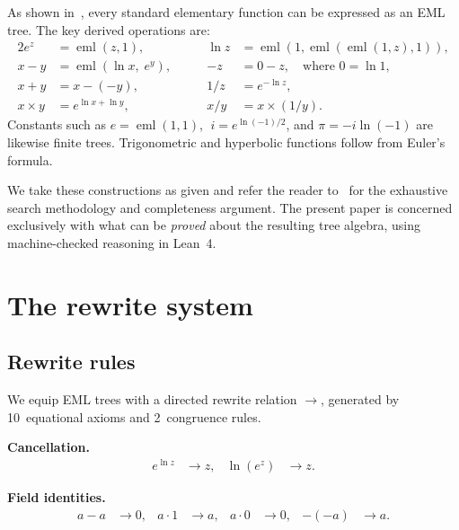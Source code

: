 \documentclass[11pt]{article}
\begin{document}
As shown in~\cite{odrzywolek2026}, every standard elementary function
can be expressed as an EML tree.  The key derived operations are:
\begin{alignat}{2}
  e^z        &= \operatorname{eml}(z, 1), &\qquad
  \ln z      &= \operatorname{eml}(1, \operatorname{eml}(\operatorname{eml}(1,z),1)),
  \label{eq:exp-ln} \\
  x - y      &= \operatorname{eml}(\ln x,\; e^y), &\qquad
  {-z}       &= 0 - z, \quad\text{where } 0 = \ln 1,
  \label{eq:sub-neg} \\
  x + y      &= x - (-y), &\qquad
  1/z        &= e^{-\ln z},
  \label{eq:add-inv} \\
  x \times y &= e^{\ln x + \ln y}, &\qquad
  x / y      &= x \times (1/y).
  \label{eq:mul-div}
\end{alignat}
Constants such as $e = \operatorname{eml}(1,1)$, $\;i = e^{\ln(-1)/2}$,
and $\pi = -i\ln(-1)$ are likewise finite trees.
Trigonometric and hyperbolic functions follow from Euler's formula.

We take these constructions as given and refer the reader
to~\cite{odrzywolek2026} for the exhaustive search methodology and
completeness argument.  The present paper is concerned exclusively with
what can be \emph{proved} about the resulting tree algebra, using
machine-checked reasoning in Lean~4.

\section{The rewrite system}
\label{sec:rewrite}

\subsection{Rewrite rules}

We equip EML trees with a directed rewrite relation $\to$, generated by
10~equational axioms and 2~congruence rules.

\medskip\noindent
\textbf{Cancellation.}
\begin{align}
  e^{\ln z} &\to z, &
  \ln(e^z)  &\to z.
  \label{eq:cancel}
\end{align}

\noindent
\textbf{Field identities.}
\begin{align}
  a - a &\to 0, &
  a \cdot 1 &\to a, &
  a \cdot 0 &\to 0, &
  -(-a) &\to a.
  \label{eq:field}
\end{align}
\end{document}
